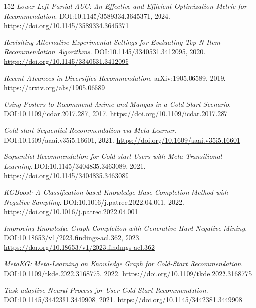 \documentclass[11pt,a4paper]{article}
\begin{document}
\begin{thebibliography}{152}
\newblock \emph{Lower-Left Partial AUC: An Effective and Efficient Optimization Metric for Recommendation}.
\newblock DOI:10.1145/3589334.3645371, 2024.
\newblock \url{https://doi.org/10.1145/3589334.3645371}

\newblock \emph{Revisiting Alternative Experimental Settings for Evaluating Top-N Item Recommendation Algorithms}.
\newblock DOI:10.1145/3340531.3412095, 2020.
\newblock \url{https://doi.org/10.1145/3340531.3412095}

\newblock \emph{Recent Advances in Diversified Recommendation}.
\newblock arXiv:1905.06589, 2019.
\newblock \url{https://arxiv.org/abs/1905.06589}

\newblock \emph{Using Posters to Recommend Anime and Mangas in a Cold-Start Scenario}.
\newblock DOI:10.1109/icdar.2017.287, 2017.
\newblock \url{https://doi.org/10.1109/icdar.2017.287}

\newblock \emph{Cold-start Sequential Recommendation via Meta Learner}.
\newblock DOI:10.1609/aaai.v35i5.16601, 2021.
\newblock \url{https://doi.org/10.1609/aaai.v35i5.16601}

\newblock \emph{Sequential Recommendation for Cold-start Users with Meta Transitional Learning}.
\newblock DOI:10.1145/3404835.3463089, 2021.
\newblock \url{https://doi.org/10.1145/3404835.3463089}

\newblock \emph{KGBoost: A Classification-based Knowledge Base Completion Method with Negative Sampling}.
\newblock DOI:10.1016/j.patrec.2022.04.001, 2022.
\newblock \url{https://doi.org/10.1016/j.patrec.2022.04.001}

\newblock \emph{Improving Knowledge Graph Completion with Generative Hard Negative Mining}.
\newblock DOI:10.18653/v1/2023.findings-acl.362, 2023.
\newblock \url{https://doi.org/10.18653/v1/2023.findings-acl.362}

\newblock \emph{MetaKG: Meta-Learning on Knowledge Graph for Cold-Start Recommendation}.
\newblock DOI:10.1109/tkde.2022.3168775, 2022.
\newblock \url{https://doi.org/10.1109/tkde.2022.3168775}

\newblock \emph{Task-adaptive Neural Process for User Cold-Start Recommendation}.
\newblock DOI:10.1145/3442381.3449908, 2021.
\newblock \url{https://doi.org/10.1145/3442381.3449908}


\end{thebibliography}
\end{document}
